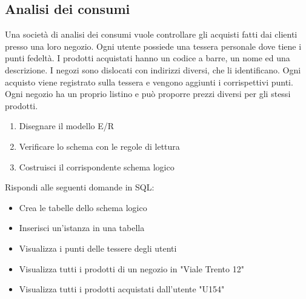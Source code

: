 \documentclass{article}
\begin{document}
	\subsection{Analisi dei consumi}
	Una società di analisi dei consumi vuole controllare gli acquisti fatti dai clienti presso una loro negozio. Ogni utente possiede una tessera personale dove tiene i punti fedeltà. I prodotti acquistati hanno un codice a barre, un nome ed una descrizione. I negozi sono dislocati con indirizzi diversi, che li identificano. Ogni acquisto viene registrato sulla tessera e vengono aggiunti i corrispettivi punti. Ogni negozio ha un proprio listino e può proporre prezzi diversi per gli stessi prodotti.
	\begin{enumerate}
		\item Disegnare il modello E/R
		\item Verificare lo schema con le regole di lettura
		\item Costruisci il corrispondente schema logico
	\end{enumerate}
	Rispondi alle seguenti domande in SQL:
	\begin{itemize}
		\item Crea le tabelle dello schema logico
		\item Inserisci un'istanza in una tabella
		\item Visualizza i punti delle tessere degli utenti
		\item Visualizza tutti i prodotti di un negozio in "Viale Trento 12"
		\item Visualizza tutti i prodotti acquistati dall'utente "U154"
	\end{itemize}
	
\end{document}
